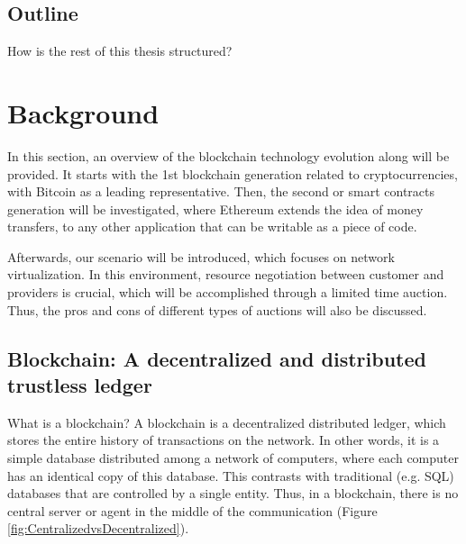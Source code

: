 \section{Outline}

How is the rest of this thesis structured?


\chapter{Background}
\label{ch:background}

In this section, an overview of the blockchain technology evolution along will be provided. It starts with the 1st blockchain generation related to cryptocurrencies, with Bitcoin as a leading representative. Then, the second or smart contracts generation will be investigated, where Ethereum extends the idea of money transfers, to any other application that can be writable as a piece of code.

Afterwards, our scenario will be introduced, which focuses on network virtualization. In this environment, resource negotiation between customer and providers is crucial, which will be accomplished through a limited time auction. Thus, the pros and cons of different types of auctions will also be discussed.

\section{Blockchain: A decentralized and distributed trustless ledger}

What is a blockchain? A blockchain is a decentralized distributed ledger, which stores the entire history of transactions on the network. In other words, it is a simple database distributed among a network of computers, where each computer has an identical copy of this database. This contrasts with traditional (e.g. SQL) databases that are controlled by a single entity. Thus, in a blockchain, there is no central server or agent in the middle of the communication (Figure \ref{fig:CentralizedvsDecentralized}).

